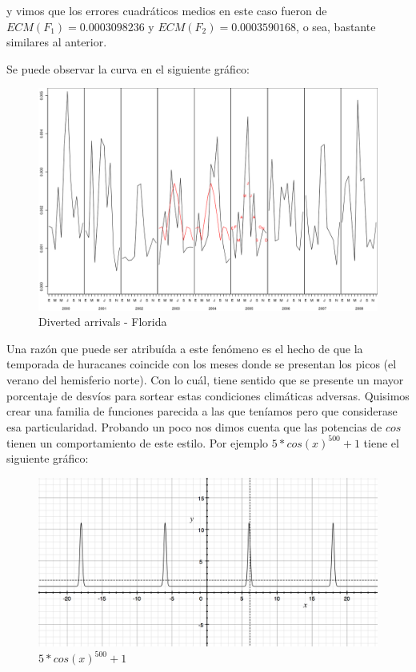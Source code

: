 \documentclass{endm}
\begin{document}
y vimos que los errores cuadr\'aticos medios en este caso fueron de $ECM(F_1) = 0.0003098236$ y $ECM(F_2) = 0.0003590168$, o sea, bastante similares al anterior.

Se puede observar la curva en el siguiente gr\'afico:

\begin{figure}[h!]
  \begin{center}
	\includegraphics[scale=0.4]{img/plot_FL_2003-2005.png}
	\caption{Diverted arrivals - Florida}
  \end{center}
  \label{diverted-arrivals-florida}
\end{figure}

Una raz\'on que puede ser atribu\'ida a este fen\'omeno es el hecho de que la temporada de huracanes coincide con los meses donde se presentan los picos (el verano del hemisferio norte). Con lo cu\'al, tiene sentido que se presente un mayor porcentaje de desv\'ios para sortear estas condiciones clim\'aticas adversas. Quisimos crear una familia de funciones parecida a las que ten\'iamos pero que considerase esa particularidad.
Probando un poco nos dimos cuenta que las potencias de $cos$ tienen un comportamiento de este estilo. Por ejemplo $5*cos(x)^{500} + 1$ tiene el siguiente gr\'afico:

\begin{figure}[h!]
  \begin{center}
	\includegraphics[scale=0.4]{img/cos500.png}
	\caption{$5*cos(x)^{500} + 1$}
  \end{center}
\end{figure}
\end{document}
